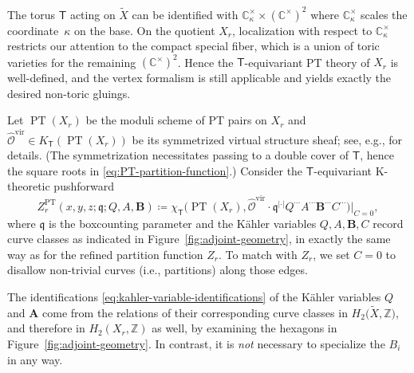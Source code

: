 \documentclass[10pt,a4paper]{amsart}
\numberwithin{equation}{section}
\renewcommand{\hat}[1]{\widehat{#1}}
\renewcommand{\vec}[1]{\bm{#1}}
\renewcommand{\tilde}[1]{\widetilde{#1}}
\newcommand{\bC}{\mathbb{C}}
\newcommand{\bZ}{\mathbb{Z}}
\newcommand{\cO}{\mathcal{O}}
\newcommand{\fq}{\mathfrak{q}}
\newcommand{\sT}{\mathsf{T}}
\newcommand{\vir}{\mathrm{vir}}
\DeclareMathOperator{\PT}{PT}
\begin{document}
\begin{MyParagraph}
The torus $\sT$ acting on $\tilde X$ can be identified with
$\bC_\kappa^\times \times (\bC^\times)^2$ where $\bC_\kappa^\times$
scales the coordinate~$\kappa$ on the base. On the quotient $X_r$,
localization with respect to $\bC_{\kappa}^\times$ restricts our
attention to the compact special fiber, which is a union of toric
varieties for the remaining $(\bC^\times)^2$. Hence the
$\sT$-equivariant PT theory of $X_r$ is well-defined, and the vertex
formalism is still applicable and yields exactly the desired non-toric
gluings.

\begin{Definition}
 Let $\PT(X_r)$ be the moduli scheme of PT pairs on $X_r$ and
 $\hat\cO^{\vir} \in K_{\sT}(\PT(X_r))$ be its symmetrized virtual
 structure sheaf; see, e.g., \cite[Section~3.2]{Okounkov2017} for details.
 (The symmetrization necessitates passing to a double cover of $\sT$,
 hence the square roots in \eqref{eq:PT-partition-function}.)
 Consider the $\sT$-equivariant K-theoretic pushforward
 \begin{equation}\label{eq:adjoint-PT-function}
 Z_r^{\PT}(x, y, z; \fq; Q, A, \vec B) \coloneqq \chi_{\sT}\big(\PT(X_r), \hat\cO^{\vir} \cdot \fq^{|\cdot|} Q^{\cdots} A^{\cdots} \vec B^{\cdots} C^{\cdots} \big)\big|_{C=0},
 \end{equation}
 where $\fq$ is the boxcounting parameter and the K\"ahler variables
 $Q, A, \vec B, C$ record curve classes as indicated in
 Figure~\ref{fig:adjoint-geometry}, in exactly the same way as for
 the refined partition function $Z_r$. To match with $Z_r$, we set $C
 = 0$ to disallow non-trivial curves (i.e., partitions) along those edges.
\end{Definition}

\begin{Remark}
 The identifications \eqref{eq:kahler-variable-identifications} of
 the K\"ahler variables $Q$ and $\vec A$ come from the relations of
 their corresponding curve classes in $H_2\big(\tilde X, \bZ\big)$, and
 therefore in $H_2(X_r, \bZ)$ as well, by examining the hexagons in
 Figure~\ref{fig:adjoint-geometry}. In contrast, it is {\it not}
 necessary to specialize the $B_i$ in any way.
\end{Remark}
\end{MyParagraph}
\end{document}
